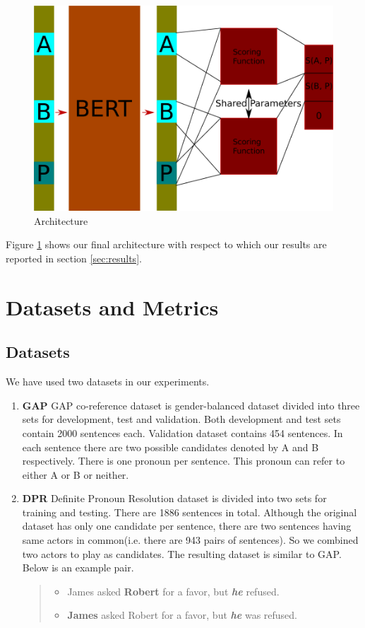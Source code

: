 \documentclass[11pt,a4paper]{article}
\begin{document}
\begin{figure}
  \centering
  \includegraphics[width=.4\textwidth]{arch.png}
  \caption{Architecture}
  \label{fig:arch}
\end{figure}

Figure \ref{fig:arch} shows our final architecture with respect to which our results are reported in section \ref{sec:results}.
\section{Datasets and Metrics}

\subsection{Datasets}
\label{subsec:datasets}
We have used two datasets in our experiments.
\begin{enumerate}
\item \textbf{GAP} GAP co-reference dataset \cite{webster2018gap} is gender-balanced dataset divided into three sets for development, test and validation. Both development and test sets contain 2000 sentences each. Validation dataset contains 454 sentences. In each sentence there are two possible candidates denoted by A and B respectively. There is one pronoun per sentence. This pronoun can refer to either A or B or neither. 


\item \textbf{DPR} Definite Pronoun Resolution \cite{rahman2012resolving} dataset is divided into two sets for training and testing. There are 1886 sentences in total. Although the original dataset has only one candidate per sentence, there are two sentences having same actors in common(i.e. there are 943 pairs of sentences). So we combined two actors to play as candidates. The resulting dataset is similar to GAP. Below is an example pair.
  \begin{quote}
    \begin{itemize}
    \item James asked \textbf{Robert} for a favor, but \textit{\textbf{he}} refused.
    \item \textbf{James} asked Robert for a favor, but \textit{\textbf{he}} was refused.
    \end{itemize}
  \end{quote}
\end{enumerate}
\end{document}

